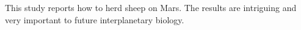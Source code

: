 This study reports how to herd sheep on Mars. The results are intriguing and very important to future interplanetary biology.
